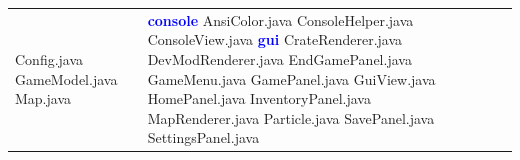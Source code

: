 \documentclass[a4paper, 12pt]{article}
\begin{document}
\begin{landscape}
\begin{table}[H]
\begin{tabular}{|p{5.5cm}|p{5.5cm}|p{5.5cm}|p{5.5cm}|}
                        Config.java \newline
                        GameModel.java \newline
                        Map.java
                        &
                        \textcolor{blue}{\textbf{console}} \newline
                            \hspace*{0.4cm} AnsiColor.java \newline
                            \hspace*{0.4cm} ConsoleHelper.java \newline
                            \hspace*{0.4cm} ConsoleView.java \newline
                        \textcolor{blue}{\textbf{gui}} \newline
                            \hspace*{0.4cm} CrateRenderer.java \newline
                            \hspace*{0.4cm} DevModRenderer.java \newline
                            \hspace*{0.4cm} EndGamePanel.java \newline
                            \hspace*{0.4cm} GameMenu.java \newline
                            \hspace*{0.4cm} GamePanel.java \newline
                            \hspace*{0.4cm} GuiView.java \newline
                            \hspace*{0.4cm} HomePanel.java \newline
                            \hspace*{0.4cm} InventoryPanel.java \newline
                            \hspace*{0.4cm} MapRenderer.java \newline
                            \hspace*{0.4cm} Particle.java \newline
                            \hspace*{0.4cm} SavePanel.java \newline
                            \hspace*{0.4cm} SettingsPanel.java \newline

\end{tabular}
\end{table}
\end{landscape}
\end{document}
